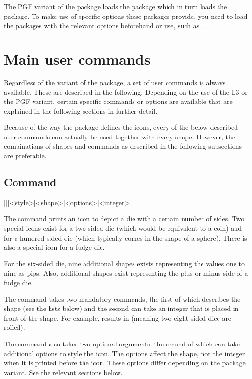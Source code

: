 \documentclass[a4paper]{article}
\begin{document}
The PGF variant of the package loads the  package which in turn loads the  package. To make use of specific options these packages provide, you need to load the packages with the relevant options beforehand or use, such as .

\section{Main user commands}

Regardless of the variant of the package, a set of user commands is always available. These are described in the following. Depending on the use of the L3 or the PGF variant, certain specific commands or options are available that are explained in the following sections in further detail.

Because of the way the package defines the icons, every of the below described user commands can actually be used together with every shape. However, the combinations of shapes and commands as described in the following subsections are preferable.

\subsection[Command \textbackslash die]{Command }

\begin{macrodef}
|\die|[<style>]{<shape>}[<options>]{<integer>}
\end{macrodef}
The command \macro{\die} prints an icon to depict a die with a certain number of sides. Two special icons exist for a two-sided die (which would be equivalent to a coin) and for a hundred-sided die (which typically comes in the shape of a sphere). There is also a special icon for a fudge die. 

For the six-sided die, nine additional shapes exists representing the values one to nine as pips. Also, additional shapes exist representing the plus or minus side of a fudge die.

The command takes two mandatory commands, the first of which describes the shape (see the lists below) and the second can take an integer that is placed in front of the shape. For example,  results in  (meaning two eight-sided dice are rolled).

The command also takes two optional arguments, the second of which can take additional options to style the icon. The options affect the shape, not the integer when it is printed before the icon. These options differ depending on the package variant. See the relevant sections below.
\end{document}
